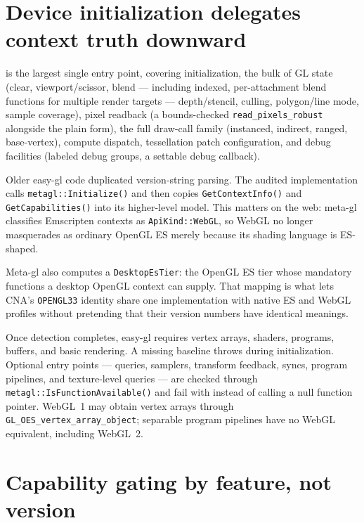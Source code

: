 \section{Device initialization delegates context truth downward}

 is the largest single entry point, covering initialization, the
bulk of GL state (clear, viewport/scissor, blend --- including indexed, per-attachment blend
functions for multiple render targets --- depth/stencil, culling, polygon/line mode, sample
coverage), pixel readback (a bounds-checked \texttt{read\_pixels\_robust} alongside the plain
form), the full draw-call family (instanced, indirect, ranged, base-vertex), compute
dispatch, tessellation patch configuration, and debug facilities (labeled debug groups, a
settable debug callback).

Older easy-gl code duplicated version-string parsing. The audited implementation calls
\texttt{metagl::Initialize()} and then copies \texttt{GetContextInfo()} and
\texttt{GetCapabilities()} into its higher-level model. This matters on the web: meta-gl
classifies Emscripten contexts as \texttt{ApiKind::WebGL}, so WebGL no longer masquerades as
ordinary OpenGL ES merely because its shading language is ES-shaped.

Meta-gl also computes a \texttt{DesktopEsTier}: the OpenGL ES tier whose mandatory functions
a desktop OpenGL context can supply. That mapping is what lets CNA's \texttt{OPENGL33}
identity share one implementation with native ES and WebGL profiles without pretending that
their version numbers have identical meanings.

Once detection completes, easy-gl requires vertex arrays, shaders, programs, buffers, and
basic rendering. A missing baseline throws during initialization. Optional entry points ---
queries, samplers, transform feedback, syncs, program pipelines, and texture-level queries ---
are checked through \texttt{metagl::IsFunctionAvailable()} and fail with
 instead of calling a null function pointer.
WebGL~1 may obtain vertex arrays through \texttt{GL\_OES\_vertex\_array\_object}; separable
program pipelines have no WebGL equivalent, including WebGL~2.

\section{Capability gating by feature, not version}

